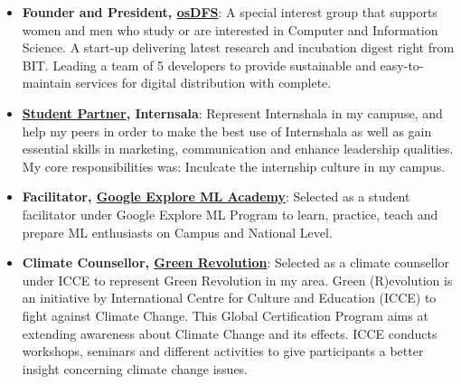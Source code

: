 \documentclass[a4paper,10pt]{extarticle} %
\begin{document}
\begin{itemize}[leftmargin=0.55cm, rightmargin=0.2cm, label={\Large\textbullet}]

\item\textbf{Founder and President, {\href{https://www.osdfs.in}{osDFS}}}: A special interest group that supports women and men who study or are interested in Computer and Information Science. A start-up delivering latest research and incubation digest right from BIT. Leading a team of 5 developers to provide sustainable and easy-to-maintain services for digital distribution with complete. 

\item \textbf{\href{https://internshala.com/}{Student Partner}, Internsala}: Represent Internshala in my campuse, and help my peers in order to make the best use of Internshala as well as gain essential skills in marketing, communication and enhance leadership qualities. My core responsibilities was: Inculcate the internship culture in my campus.

\item \textbf{Facilitator, \href{https://events.withgoogle.com/explore-ml-in/}{Google Explore ML Academy}}: Selected as a student facilitator under Google Explore ML Program to learn, practice, teach and prepare ML enthusiasts on Campus and National Level.

\item \textbf{Climate Counsellor, \href{https://intcce.org/green/}{Green Revolution}}: Selected as a climate counsellor under ICCE to represent Green Revolution in my area. Green (R)evolution is an initiative by International Centre for Culture and Education (ICCE) to fight against Climate Change. This Global Certification Program aims at extending awareness about Climate Change and its effects. ICCE conducts workshops, seminars and different activities to give participants a better insight concerning climate change issues.

\end{itemize}



\end{document}
